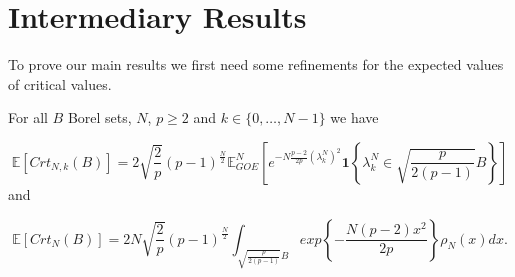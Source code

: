 \section{Intermediary Results}
To prove our main results we first need some refinements for the expected values of critical values.

\begin{theorem}
	For all $B$ Borel sets, $N$, $p\geq 2$ and $k\in\{0,\dots,N-1\}$ we have

	\begin{equation}\label{thm:2.1}
		\mathbb E[Crt_{N,k}(B)]=2\sqrt{\frac{2}{p}}(p-1)^{\frac{N}{2}}\mathbb E_{GOE}^N\left[e^{-N\frac{p-2}{2p}(\lambda_k^N)^2}\bm 1\left\{\lambda_k^N\in\sqrt{\frac{p}{2(p-1)}}B \right\}\right]
	\end{equation} and
	
	\begin{equation}\label{thm:2.2}
		\mathbb E[Crt_N(B)]=2N\sqrt{\frac{2}{p}}(p-1)^{\frac{N}{2}}\int_{\sqrt{\frac{p}{2(p-1)}}B}exp\left\{-\frac{N(p-2)x^2}{2p}\right\}\rho_N(x)dx.
	\end{equation}
\end{theorem}

